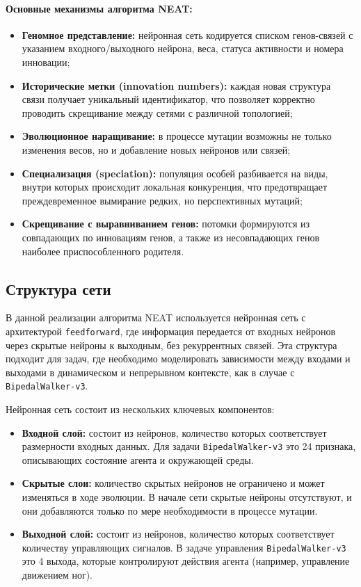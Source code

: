 \documentclass[a4paper,12pt]{article}
\begin{document}
\paragraph{Основные механизмы алгоритма NEAT:}
\begin{itemize}
    \item \textbf{Геномное представление:} нейронная сеть кодируется списком генов-связей с указанием входного/выходного нейрона, веса, статуса активности и номера инновации;
    \item \textbf{Исторические метки (innovation numbers):} каждая новая структура связи получает уникальный идентификатор, что позволяет корректно проводить скрещивание между сетями с различной топологией;
    \item \textbf{Эволюционное наращивание:} в процессе мутации возможны не только изменения весов, но и добавление новых нейронов или связей;
    \item \textbf{Специализация (speciation):} популяция особей разбивается на виды, внутри которых происходит локальная конкуренция, что предотвращает преждевременное вымирание редких, но перспективных мутаций;
    \item \textbf{Скрещивание с выравниванием генов:} потомки формируются из совпадающих по инновациям генов, а также из несовпадающих генов наиболее приспособленного родителя.
\end{itemize}

\subsection{Структура сети}
В данной реализации алгоритма NEAT используется нейронная сеть с архитектурой \texttt{feedforward}, где информация передается от входных нейронов через скрытые нейроны к выходным, без рекуррентных связей. Эта структура подходит для задач, где необходимо моделировать зависимости между входами и выходами в динамическом и непрерывном контексте, как в случае с \texttt{BipedalWalker-v3}.

Нейронная сеть состоит из нескольких ключевых компонентов:
\begin{itemize}
\item \textbf{Входной слой:} состоит из нейронов, количество которых соответствует размерности входных данных. Для задачи \texttt{BipedalWalker-v3} это 24 признака, описывающих состояние агента и окружающей среды.
    \item \textbf{Скрытые слои:} количество скрытых нейронов не ограничено и может изменяться в ходе эволюции. В начале сети скрытые нейроны отсутствуют, и они добавляются только по мере необходимости в процессе мутации.
    \item \textbf{Выходной слой:} состоит из нейронов, количество которых соответствует количеству управляющих сигналов. В задаче управления \texttt{BipedalWalker-v3} это 4 выхода, которые контролируют действия агента (например, управление движением ног).
\end{itemize}
\end{document}
